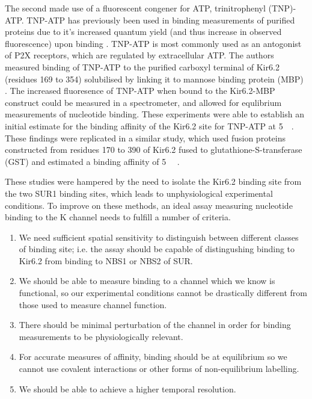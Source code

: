 The second made use of a fluorescent congener for ATP, trinitrophenyl (TNP)-ATP.
TNP-ATP has previously been used in binding measurements of purified proteins due to it's increased quantum yield (and thus increase in observed fluorescence) upon binding \cite{hiratsuka_preparation_1973, hiratsuka_biological_1982}.
TNP-ATP is most commonly used as an antogonist of P2X receptors, which are regulated by extracellular ATP.
The authors measured binding of TNP-ATP to the purified carboxyl terminal of Kir6.2 (residues 169 to 354) solubilised by linking it to mannose binding protein (MBP) \cite{vanoye_carboxyl_2002}.
The increased fluoresence of TNP-ATP when bound to the Kir6.2-MBP construct could be measured in a spectrometer, and allowed for equlibrium measurements of nucleotide binding.
These experiments were able to establish an initial estimate for the binding affinity of the Kir6.2 site for TNP-ATP at \SI{5}{\micro\Molar}.
These findings were replicated in a similar study, which used fusion proteins constructed from residues 170 to 390 of Kir6.2 fused to glutathione-S-transferase (GST) and estimated a binding affinity of \SI{5}{\micro\Molar} \cite{wang_inhibition_2006}.

These studies were hampered by the need to isolate the Kir6.2 binding site from the two SUR1 binding sites, which leads to unphysiological experimental conditions.
To improve on these methods, an ideal assay measuring nucleotide binding to the K\ATP{} channel needs to fulfill a number of criteria.

\begin{enumerate}
	\item We need sufficient spatial sensitivity to distinguish between different classes of binding site; i.e. the assay should be capable of distingushing binding to Kir6.2 from binding to NBS1 or NBS2 of SUR.
	\item We should be able to measure binding to a channel which we know is functional, so our experimental conditions cannot be drastically different from those used to measure channel function.
	\item There should be minimal perturbation of the channel in order for binding measurements to be physiologically relevant.
	\item For accurate measures of affinity, binding should be at equilibrium so we cannot use covalent interactions or other forms of non-equilibrium labelling.
	\item We should be able to achieve a higher temporal resolution.
\end{enumerate}

